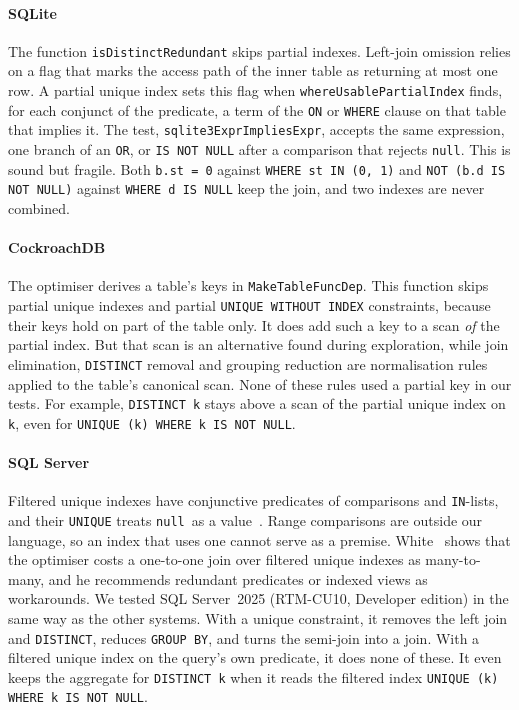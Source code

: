 \documentclass[conference]{IEEEtran}
\theoremstyle{definition}
\newcommand{\sql}[1]{\texttt{#1}}
\newcommand{\nul}{\texttt{null}}
\begin{document}
\paragraph*{SQLite} The function \sql{isDistinctRedundant} skips partial indexes. Left-join omission relies on a flag
that marks the access path of the inner table as returning at most one row. A partial unique index sets this flag when
\sql{whereUsablePartialIndex} finds, for each conjunct of the predicate, a term of the \sql{ON} or \sql{WHERE} clause on
that table that implies it. The test, \sql{sqlite3ExprImpliesExpr}, accepts the same expression, one branch of an
\sql{OR}, or \sql{IS NOT NULL} after a comparison that rejects \nul. This is sound but fragile. Both \sql{b.st = 0}
against \sql{WHERE st IN (0, 1)} and \sql{NOT (b.d IS NOT NULL)} against \sql{WHERE d IS NULL} keep the join, and two
indexes are never combined.

\paragraph*{CockroachDB} The optimiser derives a table's keys in \sql{MakeTableFuncDep}. This function skips partial
unique indexes and partial \sql{UNIQUE WITHOUT INDEX} constraints, because their keys hold on part of the table only. It
does add such a key to a scan \emph{of} the partial index. But that scan is an alternative found during exploration,
while join elimination, \sql{DISTINCT} removal and grouping reduction are normalisation rules applied to the table's
canonical scan. None of these rules used a partial key in our tests. For example, \sql{DISTINCT k} stays above a scan of
the partial unique index on \sql{k}, even for \sql{UNIQUE (k) WHERE k IS NOT NULL}.

\paragraph*{SQL Server} Filtered unique indexes have conjunctive predicates of comparisons and \sql{IN}-lists, and their
\sql{UNIQUE} treats \nul\ as a value~\cite{SQLServerDoc}. Range comparisons are outside our language, so an index that
uses one cannot serve as a premise. White~\cite{White13} shows that the optimiser costs a one-to-one join over filtered
unique indexes as many-to-many, and he recommends redundant predicates or indexed views as workarounds. We tested SQL
Server~2025 (RTM-CU10, Developer edition) in the same way as the other systems. With a unique constraint, it removes the
left join and \sql{DISTINCT}, reduces \sql{GROUP BY}, and turns the semi-join into a join. With a filtered unique index on
the query's own predicate, it does none of these. It even keeps the aggregate for \sql{DISTINCT k} when it reads the
filtered index \sql{UNIQUE (k) WHERE k IS NOT NULL}.
\end{document}
